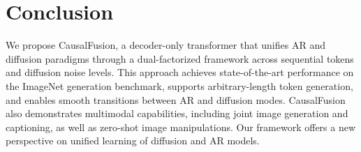 \vspace{-3pt}
\section{Conclusion}
We propose CausalFusion, a decoder-only transformer that unifies AR and diffusion paradigms through a dual-factorized framework across sequential tokens and diffusion noise levels. This approach achieves state-of-the-art performance on the ImageNet generation benchmark, supports arbitrary-length token generation, and enables smooth transitions between AR and diffusion modes. CausalFusion also demonstrates multimodal capabilities, including joint image generation and captioning, as well as zero-shot image manipulations. Our framework offers a new perspective on unified learning of diffusion and AR models.

